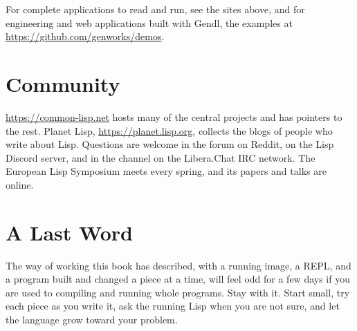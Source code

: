 For complete applications to read and run, see the sites above, and
for engineering and web applications built with Gendl, the examples at
\url{https://github.com/genworks/demos}.

\section{Community}

\url{https://common-lisp.net} hosts many of the central projects and
has pointers to the rest. Planet Lisp, \url{https://planet.lisp.org},
collects the blogs of people who write about Lisp. Questions are
welcome in the  forum on Reddit, on the Lisp
Discord server, and in the  channel on the
Libera.Chat IRC network. The European Lisp Symposium meets every
spring, and its papers and talks are online.

\section{A Last Word}

The way of working this book has described, with a running image, a
REPL, and a program built and changed a piece at a time, will feel odd
for a few days if you are used to compiling and running whole
programs. Stay with it. Start small, try each piece as you write it,
ask the running Lisp when you are not sure, and let the language grow
toward your problem.
